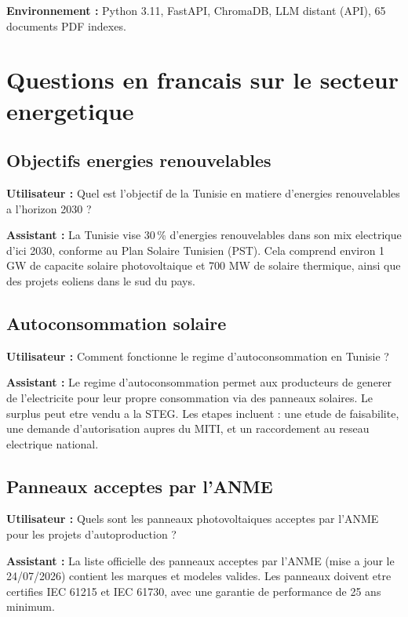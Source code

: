 \documentclass[12pt,a4paper,oneside]{article}
\newcommand{\prompt}[1]{%
  \noindent\colorbox{PromptBg}{\parbox{\dimexpr\linewidth-2\fboxsep}{%
    \small\textbf{\textcolor{MainBlue}{Utilisateur :}} #1%
  }}\vspace{3pt}%
}
\newcommand{\botreply}[1]{%
  \noindent\colorbox{OutputBg}{\parbox{\dimexpr\linewidth-2\fboxsep}{%
    \small\textbf{\textcolor{PassGreen!70!black}{Assistant :}} #1%
  }}\vspace{6pt}%
}
\begin{document}
\bigskip\noindent\textbf{Environnement :} Python 3.11, FastAPI, ChromaDB, LLM distant (API), 65 documents PDF indexes.

\clearpage

\section{Questions en francais sur le secteur energetique}

\subsection{Objectifs energies renouvelables}

\prompt{Quel est l'objectif de la Tunisie en matiere d'energies renouvelables a l'horizon 2030 ?}

\botreply{
La Tunisie vise 30\,\% d'energies renouvelables dans son mix electrique d'ici 2030, conforme au Plan Solaire Tunisien (PST). Cela comprend environ 1 GW de capacite solaire photovoltaique et 700 MW de solaire thermique, ainsi que des projets eoliens dans le sud du pays.
}

\subsection{Autoconsommation solaire}

\prompt{Comment fonctionne le regime d'autoconsommation en Tunisie ?}

\botreply{
Le regime d'autoconsommation permet aux producteurs de generer de l'electricite pour leur propre consommation via des panneaux solaires. Le surplus peut etre vendu a la STEG. Les etapes incluent : une etude de faisabilite, une demande d'autorisation aupres du MITI, et un raccordement au reseau electrique national.
}

\subsection{Panneaux acceptes par l'ANME}

\prompt{Quels sont les panneaux photovoltaiques acceptes par l'ANME pour les projets d'autoproduction ?}

\botreply{
La liste officielle des panneaux acceptes par l'ANME (mise a jour le 24/07/2026) contient les marques et modeles valides. Les panneaux doivent etre certifies IEC 61215 et IEC 61730, avec une garantie de performance de 25 ans minimum.
}
\end{document}
